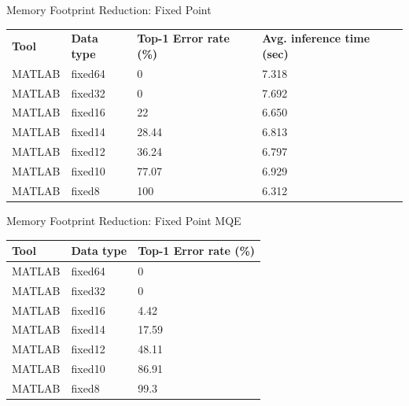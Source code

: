 \begin{frame}{Memory Footprint Reduction: Fixed Point}
	\begin{table}[H]
		\centering
		\begin{tabular}{p{2cm} p{2cm} p{3cm} p{3cm}}
			\toprule
			\textbf{Tool} & \textbf{Data type} & \textbf{Top-1 Error rate (\%)} & \textbf{Avg. inference time (sec)} \\
			MATLAB        & fixed64            & 0                              & 7.318                              \\
			MATLAB        & fixed32            & 0                              & 7.692                              \\
			MATLAB        & fixed16            & 22                             & 6.650                              \\
			MATLAB        & fixed14            & 28.44                          & 6.813                              \\
			MATLAB        & fixed12            & 36.24                          & 6.797                              \\
			MATLAB        & fixed10            & 77.07                          & 6.929                              \\
			MATLAB        & fixed8             & 100                            & 6.312                              \\
			\bottomrule
		\end{tabular}
	\end{table}
\end{frame}

\begin{frame}{Memory Footprint Reduction: Fixed Point MQE}
	\begin{table}[H]
		\centering
		\begin{tabular}{lll}
			\toprule
			\textbf{Tool} & \textbf{Data type} & \textbf{Top-1 Error rate (\%)}\\
			\midrule
				MATLAB 	& fixed64	& 0 	\\
				MATLAB 	& fixed32	& 0 	\\
				MATLAB 	& fixed16	& 4.42 	\\
				MATLAB 	& fixed14	& 17.59 \\
				MATLAB 	& fixed12	& 48.11 \\
				MATLAB 	& fixed10	& 86.91	\\
				MATLAB 	& fixed8	& 99.3 	\\
			\bottomrule
		\end{tabular}
	\end{table}
\end{frame}

